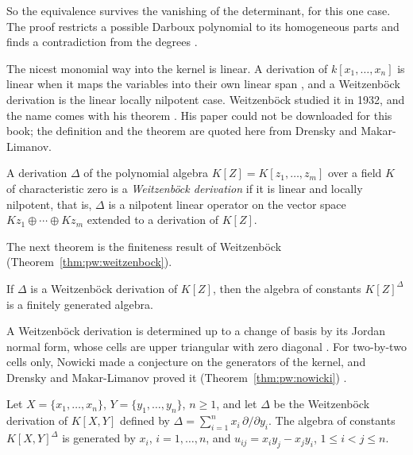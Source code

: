 So the equivalence survives the vanishing of the determinant, for this one
case. The proof restricts a possible Darboux polynomial to its homogeneous
parts and finds a contradiction from the degrees
\cite[p.~3]{Li2015DarbouxMonomial}.

The nicest monomial way into the kernel is linear. A derivation of
$k[x_{1},\dots,x_{n}]$ is linear when it maps the variables into their own
linear span \cite[p.~394]{DrenskyGupta2005}, and a Weitzenb\"ock
derivation is the linear locally nilpotent case. Weitzenb\"ock studied it
in 1932, and the name comes with his theorem
\cite[p.~41]{DrenskyMakarLimanov2009}. His paper could not be downloaded
for this book; the definition and the theorem are quoted here from Drensky
and Makar-Limanov.

\begin{definition}\label{def:pw:weitzenbock}
A derivation $\Delta$ of the polynomial algebra $K[Z]=K[z_{1},\dots,z_{m}]$
over a field $K$ of characteristic zero is a \emph{Weitzenb\"ock
derivation} if it is linear and locally nilpotent, that is, $\Delta$ is a
nilpotent linear operator on the vector space
$Kz_{1}\oplus\cdots\oplus Kz_{m}$ extended to a derivation of $K[Z]$.
\end{definition}

The next theorem is the finiteness result of Weitzenb\"ock (Theorem~\ref{thm:pw:weitzenbock}).

\begin{theorem}\label{thm:pw:weitzenbock}
If $\Delta$ is a Weitzenb\"ock derivation of $K[Z]$, then the algebra of
constants $K[Z]^{\Delta}$ is a finitely generated algebra.
\end{theorem}

A Weitzenb\"ock derivation is determined up to a change of basis by its
Jordan normal form, whose cells are upper triangular with zero diagonal
\cite[p.~42]{DrenskyMakarLimanov2009}. For two-by-two cells only, Nowicki
made a conjecture on the generators of the kernel, and Drensky and
Makar-Limanov proved it (Theorem~\ref{thm:pw:nowicki}) \cite[pp.~42--45]{DrenskyMakarLimanov2009}.

\begin{theorem}\label{thm:pw:nowicki}
Let $X=\{x_{1},\dots,x_{n}\}$, $Y=\{y_{1},\dots,y_{n}\}$, $n\geq 1$, and
let $\Delta$ be the Weitzenb\"ock derivation of $K[X,Y]$ defined by
$\Delta=\sum_{i=1}^{n} x_{i}\,\partial/\partial y_{i}$. The algebra of
constants $K[X,Y]^{\Delta}$ is generated by $x_{i}$, $i=1,\dots,n$, and
$u_{ij}=x_{i}y_{j}-x_{j}y_{i}$, $1\leq i<j\leq n$.
\end{theorem}

